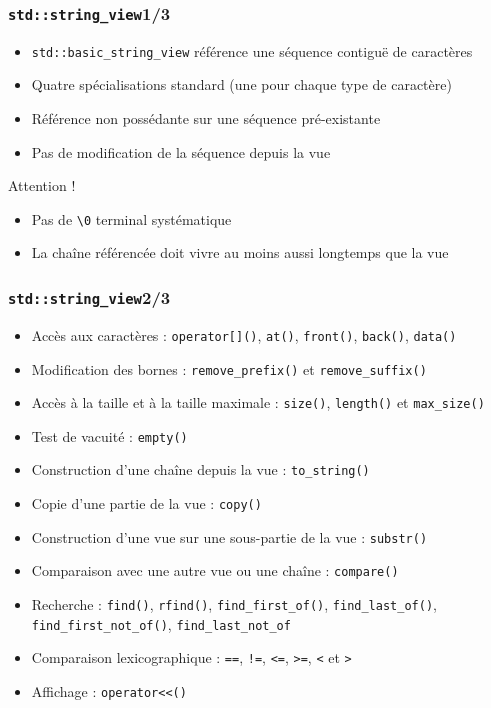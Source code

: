 \documentclass[C++.tex]{subfiles}
\begin{document}
\begin{frame}[fragile]
	\frametitle{\lstinline|std::string_view|\titlehfill{}1/3}
	\begin{itemize}
		\item \lstinline|std::basic_string_view| référence une séquence contiguë de caractères
		\item Quatre spécialisations standard (une pour chaque type de caractère)


		\item Référence non possédante sur une séquence pré-existante
		\item Pas de modification de la séquence depuis la vue
	\end{itemize}

	\begin{alertblock}{Attention !}
		\begin{itemize}
			\item Pas de \lstinline|\0| terminal systématique
			\item La chaîne référencée doit vivre au moins aussi longtemps que la vue
		\end{itemize}
	\end{alertblock}
\end{frame}

\begin{frame}[fragile]
	\frametitle{\lstinline|std::string_view|\titlehfill{}2/3}
	\begin{itemize}
		\item Accès aux caractères : \lstinline|operator[]()|, \lstinline|at()|, \lstinline|front()|, \lstinline|back()|, \lstinline|data()|
		\item Modification des bornes : \lstinline|remove_prefix()| et \lstinline|remove_suffix()|
		\item Accès à la taille et à la taille maximale : \lstinline|size()|, \lstinline|length()| et \lstinline|max_size()|
		\item Test de vacuité : \lstinline|empty()|
		\item Construction d'une chaîne depuis la vue : \lstinline|to_string()|
		\item Copie d'une partie de la vue : \lstinline|copy()|
		\item Construction d'une vue sur une sous-partie de la vue : \lstinline|substr()|
		\item Comparaison avec une autre vue ou une chaîne : \lstinline|compare()|
		\item Recherche : \lstinline|find()|, \lstinline|rfind()|, \lstinline|find_first_of()|, \lstinline|find_last_of()|, \lstinline|find_first_not_of()|, \lstinline|find_last_not_of|
		\item Comparaison lexicographique : \lstinline|==|, \lstinline|!=|, \lstinline|<=|, \lstinline|>=|, \lstinline|<| et \lstinline|>|
		\item Affichage : \lstinline|operator<<()|
	\end{itemize}
\end{frame}
\end{document}
